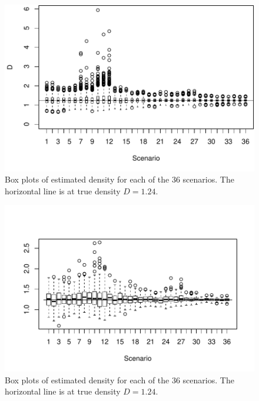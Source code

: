 \documentclass[useAMS, usenatbib, referee]{biom}\usepackage[]{graphicx}\usepackage[]{color}
\makeatletter
\def\maxwidth{ %
  \ifdim\Gin@nat@width>\linewidth
    \linewidth
  \else
    \Gin@nat@width
  \fi
}
\newenvironment{knitrout}{}{} %
\makeatother
\begin{document}
\begin{knitrout}
\color{fgcolor}\begin{figure}

{\centering \includegraphics[width=\maxwidth]{figs/fig_boxplots_bcs-1} 

}

\caption{Box plots of estimated density for each of the 36 scenarios. The horizontal line is at true density \(D=1.24\). }\label{fig:fig_boxplots_bcs}
\end{figure}


\end{knitrout}


\begin{knitrout}
\color{fgcolor}\begin{figure}

{\centering \includegraphics[width=\maxwidth]{figs/fig_boxplots-1} 

}

\caption{Box plots of estimated density for each of the 36 scenarios. The horizontal line is at true density \(D=1.24\). }\label{fig:fig_boxplots}
\end{figure}


\end{knitrout}
\end{document}
